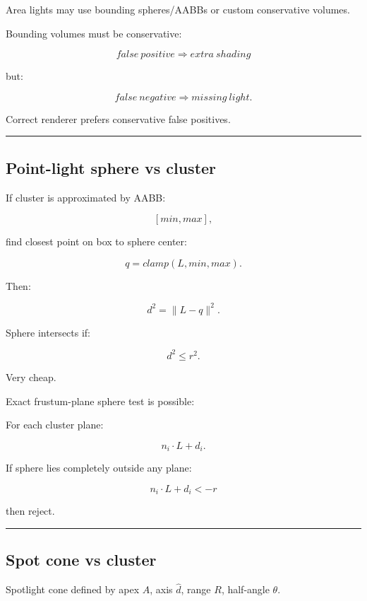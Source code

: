Area lights may use bounding spheres/AABBs or custom conservative volumes.

Bounding volumes must be conservative:

\[
\boxed{
false\ positive
\Rightarrow
extra\ shading
}
\]

but:

\[
\boxed{
false\ negative
\Rightarrow
missing\ light.
}
\]

Correct renderer prefers conservative false positives.

\begin{center}\rule{0.5\linewidth}{0.5pt}\end{center}

\subsection{Point-light sphere vs cluster}\label{04-visual-computing-ii-ch040-point-light-sphere-vs-cluster}

If cluster is approximated by AABB:

\[
[min,max],
\]

find closest point on box to sphere center:

\[
q=
clamp(
L,
min,
max
).
\]

Then:

\[
d^2=
\|L-q\|^2.
\]

Sphere intersects if:

\[
\boxed{
d^2\le r^2.
}
\]

Very cheap.

Exact frustum-plane sphere test is possible:

For each cluster plane:

\[
n_i\cdot L+d_i.
\]

If sphere lies completely outside any plane:

\[
n_i\cdot L+d_i<-r
\]

then reject.

\begin{center}\rule{0.5\linewidth}{0.5pt}\end{center}

\subsection{Spot cone vs cluster}\label{04-visual-computing-ii-ch040-spot-cone-vs-cluster}

Spotlight cone defined by apex \(A\), axis \(\hat d\), range \(R\), half-angle \(\theta\).


